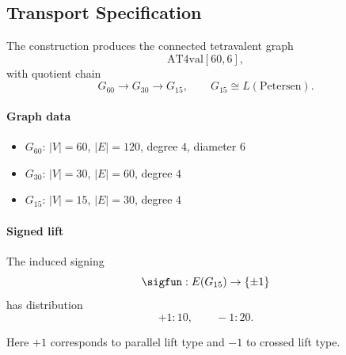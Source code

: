 
\subsection*{Transport Specification}

The construction produces the connected tetravalent graph
\[
\mathrm{AT4val}[60,6],
\]
with quotient chain
\[
G_{60} \longrightarrow G_{30} \longrightarrow G_{15},
\qquad
G_{15} \cong L(\mathrm{Petersen}).
\]

\paragraph{Graph data}
\begin{itemize}
\item $G_{60}$: $|V|=60$, $|E|=120$, degree $4$, diameter $6$
\item $G_{30}$: $|V|=30$, $|E|=60$, degree $4$
\item $G_{15}$: $|V|=15$, $|E|=30$, degree $4$
\end{itemize}

\paragraph{Signed lift}
The induced signing
\[
\sigfun : E(G_{15}) \to \{\pm 1\}
\]
has distribution
\[
+1 : 10, \qquad -1 : 20.
\]

Here $+1$ corresponds to parallel lift type and $-1$ to crossed lift type.
